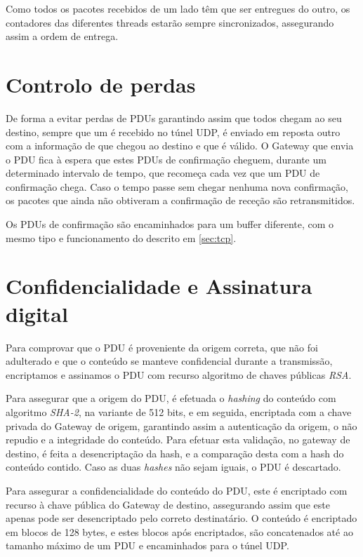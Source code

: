 \documentclass[a4paper]{report}
\begin{document}
Como todos os pacotes recebidos de um lado têm que ser entregues do outro,
os contadores das diferentes threads estarão sempre sincronizados, assegurando
assim a ordem de entrega.

\section{Controlo de perdas}

De forma a evitar perdas de PDUs garantindo assim que todos chegam ao seu
destino, sempre que um é recebido no túnel UDP, é enviado em reposta outro com a
informação de que chegou ao destino e que é válido. O Gateway que envia o PDU
fica à espera que estes PDUs de confirmação cheguem, durante um determinado
intervalo de tempo, que recomeça cada vez que um PDU de confirmação chega.
Caso o tempo passe sem chegar nenhuma nova confirmação, os pacotes que ainda
não obtiveram a confirmação de receção são retransmitidos.

Os PDUs de confirmação são encaminhados para um buffer diferente, com o mesmo
tipo e funcionamento do descrito em \ref{sec:tcp}.

\section{Confidencialidade e Assinatura digital} \label{sec:auth}

Para comprovar que o PDU é proveniente da origem correta, que não foi
adulterado e que o conteúdo se manteve confidencial durante a transmissão,
encriptamos e assinamos o PDU com recurso algoritmo de chaves públicas 
\textit{RSA}. 

Para assegurar que a origem do PDU, é efetuada o \textit{hashing} do conteúdo
com algoritmo \textit{SHA-2}, na variante de 512 bits, e em seguida, encriptada
com a chave privada do Gateway de origem, garantindo assim a autenticação da
origem, o não repudio e a integridade do conteúdo. Para efetuar esta validação,
no gateway de destino, é feita a desencriptação da hash, e a comparação desta 
com a hash do conteúdo contido. Caso as duas \textit{hashes} não sejam iguais, o
PDU é descartado.

Para assegurar a confidencialidade do conteúdo do PDU, este é encriptado com
recurso à chave pública do Gateway de destino, assegurando assim que este
apenas pode ser desencriptado pelo correto destinatário. O conteúdo é 
encriptado em blocos de 128 bytes, e estes blocos após encriptados, são
concatenados até ao tamanho máximo de um PDU e encaminhados para o túnel
UDP.
\end{document}
